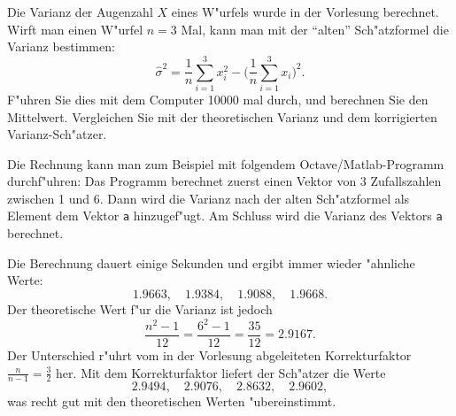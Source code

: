 Die Varianz der Augenzahl $X$ eines W"urfels wurde in der Vorlesung
berechnet. Wirft man einen W"urfel $n=3$ Mal, kann man mit der
``alten'' Sch"atzformel die Varianz bestimmen:
\[
\hat\sigma^2=\frac1n\sum_{i=1}^3x_i^2-\biggl(\frac1n\sum_{i=1}^3x_i\biggr)^2.
\]
F"uhren Sie dies mit dem Computer 10000 mal durch, und berechnen Sie den
Mittelwert. Vergleichen Sie mit der theoretischen Varianz und dem
korrigierten Varianz-Sch"atzer.

\begin{loesung}
Die Rechnung kann man zum Beispiel mit folgendem Octave/Matlab-Programm
durchf"uhren:
Das Programm berechnet zuerst einen Vektor von 3 Zufallszahlen zwischen 1
und 6. Dann wird die Varianz nach der alten Sch"atzformel als Element
dem Vektor {\tt a} hinzugef"ugt. Am Schluss wird die Varianz des Vektors
{\tt a} berechnet.

Die Berechnung dauert einige Sekunden und ergibt immer wieder
"ahnliche Werte:
\[
1.9663,\quad 
1.9384,\quad
1.9088,\quad
1.9668.
\]
Der theoretische Wert f"ur die Varianz ist jedoch
\[
\frac{n^2-1}{12}=\frac{6^2-1}{12}=\frac{35}{12}=2.9167.
\]
Der Unterschied r"uhrt vom in der Vorlesung abgeleiteten Korrekturfaktor
$\frac{n}{n-1}=\frac32$ her. Mit dem Korrekturfaktor liefert der Sch"atzer die
Werte
\[
2.9494,\quad 
2.9076,\quad
2.8632,\quad
2.9602,
\]
was recht gut mit den theoretischen Werten "ubereinstimmt.
\end{loesung}

